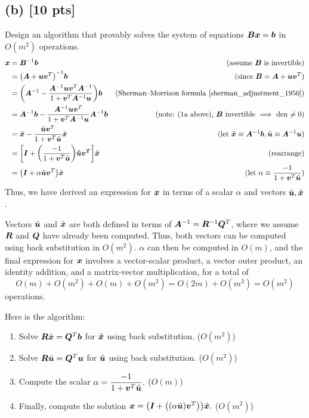 \documentclass[twoside,10pt]{article}
\begin{document}
\subsection*{(b) [10 pts]} 
Design an algorithm that provably solves the system of equations $\bm{B} \bm{x} = \bm{b}$ in $O(m^2)$ operations. 
\begin{align*}
  \vct{x} &= \mtx{B}^{-1}\vct{b}&\text{(assume $\mtx{B}$ is invertible)}\\
  &= \left(\mtx{A} + \vct{u}\vct{v}^T\right)^{-1}\vct{b}&\text{(since $\mtx{B} = \mtx{A} + \vct{u}\vct{v}^T$)}\\
  &= \left(\mtx{A}^{-1} - \dfrac{\mtx{A}^{-1}\vct{u}\vct{v}^T\mtx{A}^{-1}}{1+\vct{v}^T\mtx{A}^{-1}\vct{u}}\right)\vct{b}&\text{(Sherman–Morrison formula \cite{sherman_adjustment_1950})}\\
  &= \mtx{A}^{-1}\vct{b} - \dfrac{\mtx{A}^{-1}\vct{u}\vct{v}^T}{1+\vct{v}^T\mtx{A}^{-1}\vct{u}}\mtx{A}^{-1}\vct{b}&\text{(note: (1a above), $\mtx{B}$ invertible $\implies$ den $\neq 0$)}\\
  &= \tilde{\vct{x}} - \dfrac{\tilde{\vct{u}}\vct{v}^T}{1+\vct{v}^T\tilde{\vct{u}}}\tilde{\vct{x}}&\text{(let $\tilde{\vct{x}} \equiv \mtx{A}^{-1}\vct{b}, \tilde{\vct{u}} \equiv \mtx{A}^{-1}\vct{u}$)}\\
  &= \left[\vct{I} + \left(\dfrac{-1}{1+\vct{v}^T\tilde{\vct{u}}}\right)\vct{\tilde{\vct{u}}\vct{v}^T}\right]\tilde{\vct{x}}&\text{(rearrange)}\\
  &= \left(\vct{I} + \alpha\tilde{\vct{u}}\vct{v}^T\right)\tilde{\vct{x}}&\text{(let $\alpha \equiv \dfrac{-1}{1+\vct{v}^T\tilde{\vct{u}}}$)}
\end{align*}
\quad Thus, we have derived an expression for $\bm{x}$ in terms of a scalar $\alpha$ and vectors $\tilde{\bm{u}}, \tilde{\bm{x}}$.

\quad Vectors $\tilde{\bm{u}}$ and $\tilde{\bm{x}}$ are both defined in terms of $\bm{A}^{-1} = \bm{R}^{-1}\bm{Q}^T$, where we assume $\bm{R}$ and $\bm{Q}$ have already been computed.
Thus, both vectors can be computed using back substitution in $O(m^2)$.
$\alpha$ can then be computed in $O(m)$, and the final expression for $\bm{x}$ involves a vector-scalar product, a vector outer product, an identity addition, and a matrix-vector multiplication, for a total of
$$O(m) + O(m^2) + O(m) + O(m^2) = O(2m) + O(m^2) = O(m^2)$$
operations.

\quad Here is the algorithm:
\begin{enumerate}
  \item Solve $\bm{R}\tilde{\bm{x}} = \bm{Q}^T\bm{b}$ for $\tilde{\bm{x}}$ using back substitution. ($O(m^2)$)
  \item Solve $\bm{R}\tilde{\bm{u}} = \bm{Q}^T\bm{u}$ for $\tilde{\bm{u}}$ using back substitution. ($O(m^2)$)
  \item Compute the scalar $\alpha = \dfrac{-1}{1+\bm{v}^T\tilde{\bm{u}}}.$ ($O(m)$)
  \item Finally, compute the solution $\vct{x} = \left(\vct{I} + \left(\left(\alpha\tilde{\vct{u}}\right)\vct{v}^T\right)\right)\tilde{\vct{x}}.$ ($O(m^2)$)
\end{enumerate}
\end{document}
